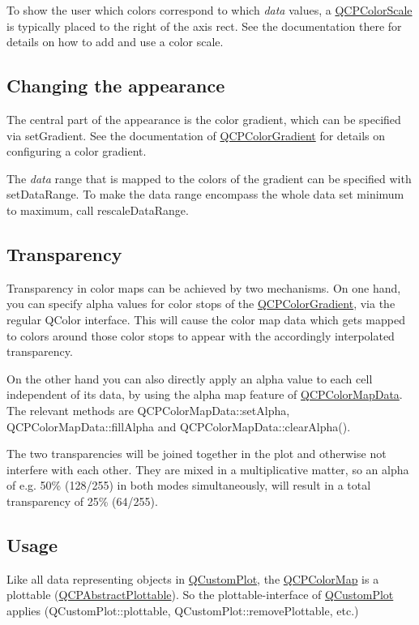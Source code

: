 To show the user which colors correspond to which {\itshape data} values, a \mbox{\hyperlink{class_q_c_p_color_scale}{Q\+C\+P\+Color\+Scale}} is typically placed to the right of the axis rect. See the documentation there for details on how to add and use a color scale.\hypertarget{class_q_c_p_color_map_qcpcolormap-appearance}{}\subsection{Changing the appearance}\label{class_q_c_p_color_map_qcpcolormap-appearance}
The central part of the appearance is the color gradient, which can be specified via set\+Gradient. See the documentation of \mbox{\hyperlink{class_q_c_p_color_gradient}{Q\+C\+P\+Color\+Gradient}} for details on configuring a color gradient.

The {\itshape data} range that is mapped to the colors of the gradient can be specified with set\+Data\+Range. To make the data range encompass the whole data set minimum to maximum, call rescale\+Data\+Range.\hypertarget{class_q_c_p_color_map_qcpcolormap-transparency}{}\subsection{Transparency}\label{class_q_c_p_color_map_qcpcolormap-transparency}
Transparency in color maps can be achieved by two mechanisms. On one hand, you can specify alpha values for color stops of the \mbox{\hyperlink{class_q_c_p_color_gradient}{Q\+C\+P\+Color\+Gradient}}, via the regular Q\+Color interface. This will cause the color map data which gets mapped to colors around those color stops to appear with the accordingly interpolated transparency.

On the other hand you can also directly apply an alpha value to each cell independent of its data, by using the alpha map feature of \mbox{\hyperlink{class_q_c_p_color_map_data}{Q\+C\+P\+Color\+Map\+Data}}. The relevant methods are Q\+C\+P\+Color\+Map\+Data\+::set\+Alpha, Q\+C\+P\+Color\+Map\+Data\+::fill\+Alpha and Q\+C\+P\+Color\+Map\+Data\+::clear\+Alpha().

The two transparencies will be joined together in the plot and otherwise not interfere with each other. They are mixed in a multiplicative matter, so an alpha of e.\+g. 50\% (128/255) in both modes simultaneously, will result in a total transparency of 25\% (64/255).\hypertarget{class_q_c_p_color_map_qcpcolormap-usage}{}\subsection{Usage}\label{class_q_c_p_color_map_qcpcolormap-usage}
Like all data representing objects in \mbox{\hyperlink{class_q_custom_plot}{Q\+Custom\+Plot}}, the \mbox{\hyperlink{class_q_c_p_color_map}{Q\+C\+P\+Color\+Map}} is a plottable (\mbox{\hyperlink{class_q_c_p_abstract_plottable}{Q\+C\+P\+Abstract\+Plottable}}). So the plottable-\/interface of \mbox{\hyperlink{class_q_custom_plot}{Q\+Custom\+Plot}} applies (Q\+Custom\+Plot\+::plottable, Q\+Custom\+Plot\+::remove\+Plottable, etc.)

